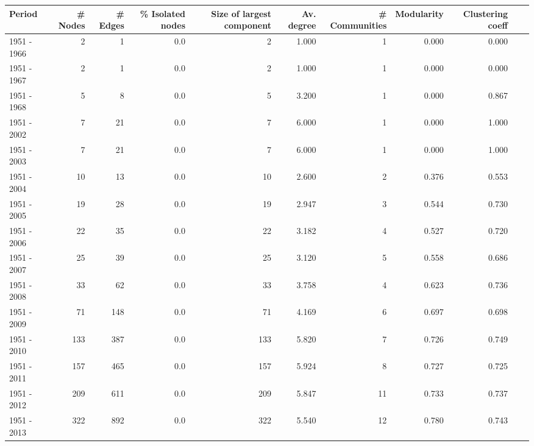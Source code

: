 \begin{tabular}{lrrrrrrrrrr}
\toprule
Period &  \# Nodes &  \# Edges &  \% Isolated nodes &  \multicolumn{1}{p{3cm}}{\centering Size of largest component} &  Av. degree &  \# Communities &  Modularity &  Clustering coeff \\
\midrule
1951 - 1966 &        2 &        1 &    0.0 &     2 &       1.000 &              1 &       0.000 &             0.000 \\
1951 - 1967 &        2 &        1 &    0.0 &     2 &       1.000 &              1 &       0.000 &             0.000 \\
1951 - 1968 &        5 &        8 &    0.0 &     5 &       3.200 &              1 &       0.000 &             0.867 \\
1951 - 2002 &        7 &       21 &    0.0 &     7 &       6.000 &              1 &       0.000 &             1.000 \\
1951 - 2003 &        7 &       21 &    0.0 &     7 &       6.000 &              1 &       0.000 &             1.000 \\
1951 - 2004 &       10 &       13 &    0.0 &    10 &       2.600 &              2 &       0.376 &             0.553 \\
1951 - 2005 &       19 &       28 &    0.0 &    19 &       2.947 &              3 &       0.544 &             0.730 \\
1951 - 2006 &       22 &       35 &    0.0 &    22 &       3.182 &              4 &       0.527 &             0.720 \\
1951 - 2007 &       25 &       39 &    0.0 &    25 &       3.120 &              5 &       0.558 &             0.686 \\
1951 - 2008 &       33 &       62 &    0.0 &    33 &       3.758 &              4 &       0.623 &             0.736 \\
1951 - 2009 &       71 &      148 &    0.0 &    71 &       4.169 &              6 &       0.697 &             0.698 \\
1951 - 2010 &      133 &      387 &    0.0 &   133 &       5.820 &              7 &       0.726 &             0.749 \\
1951 - 2011 &      157 &      465 &    0.0 &   157 &       5.924 &              8 &       0.727 &             0.725 \\
1951 - 2012 &      209 &      611 &    0.0 &   209 &       5.847 &             11 &       0.733 &             0.737 \\
1951 - 2013 &      322 &      892 &    0.0 &   322 &       5.540 &             12 &       0.780 &             0.743 \\

\end{tabular}
